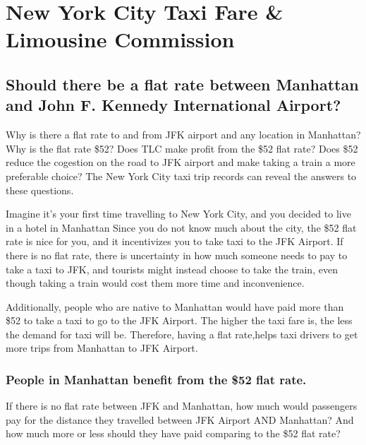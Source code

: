 \documentclass[12pt,twoside]{reedthesis}
\theoremstyle{definition}
\theoremstyle{definition}
\theoremstyle{definition}
\theoremstyle{remark}
\begin{document}
\chapter{New York City Taxi Fare \& Limousine
Commission}\label{chapter5}

\section{Should there be a flat rate between Manhattan and John F.
Kennedy International
Airport?}\label{should-there-be-a-flat-rate-between-manhattan-and-john-f.-kennedy-international-airport}

Why is there a flat rate to and from JFK airport and any location in
Manhattan? Why is the flat rate \$52? Does TLC make profit from the \$52
flat rate? Does \$52 reduce the cogestion on the road to JFK airport and
make taking a train a more preferable choice? The New York City taxi
trip records can reveal the answers to these questions.

Imagine it's your first time travelling to New York City, and you
decided to live in a hotel in Manhattan Since you do not know much about
the city, the \$52 flat rate is nice for you, and it incentivizes you to
take taxi to the JFK Airport. If there is no flat rate, there is
uncertainty in how much someone needs to pay to take a taxi to JFK, and
tourists might instead choose to take the train, even though taking a
train would cost them more time and inconvenience.

Additionally, people who are native to Manhattan would have paid more
than \$52 to take a taxi to go to the JFK Airport. The higher the taxi
fare is, the less the demand for taxi will be. Therefore, having a flat
rate,helps taxi drivers to get more trips from Manhattan to JFK Airport.

\subsection{People in Manhattan benefit from the \$52 flat
rate.}\label{people-in-manhattan-benefit-from-the-52-flat-rate.}

If there is no flat rate between JFK and Manhattan, how much would
passengers pay for the distance they travelled between JFK Airport AND
Manhattan? And how much more or less should they have paid comparing to
the \$52 flat rate?
\end{document}
